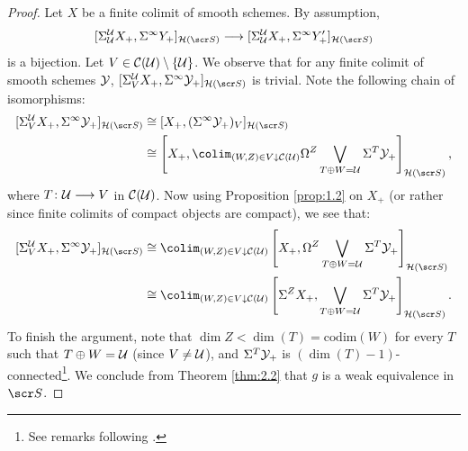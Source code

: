 \documentclass{amsart}
\theoremstyle{definition}
\begin{document}
\begin{proof}
Let $X$ be a finite colimit of smooth schemes. By assumption, \[[\SI^{\oU}_{\oU}X_+, \SI^{\infty}Y_+]_{\oH(\sS)} \rtarr [\SI^{\oU}_{\oU}X_+, \SI^{\infty}Y'_+]_{\oH(\sS)}\] \noindent is a bijection. Let $V \in {\mathcal{C}}({\mathcal{U}}) \setminus \{{\mathcal{U}}\}$. 
We observe that for any finite colimit of smooth schemes ${\mathcal{Y}}$, $[\SI^{\oU}_V X_+, \SI^{\infty}\oY_+]_{\oH(\sS)}$ is trivial. Note the following chain of isomorphisms:
\begin{equation*}
    \begin{split}
        [\SI^{\oU}_V X_+, \SI^{\infty}\oY_+]_{\oH(\sS)} &\cong [X_+, (\SI^{\infty}\oY_+)_V]_{\oH(\sS)}\\
        &\cong \left[X_+, \colim_{(W,Z) \in V \downarrow \oC(\oU)}\OM^Z\bigvee_{T \oplus W = \oU}\SI^{T}\oY_+\right]_{\oH(\sS)},
    \end{split}
\end{equation*}
where $T \colon {\mathcal{U}} \longrightarrow V$ in ${\mathcal{C}}({\mathcal{U}})$. Now using Proposition \ref{prop:1.2} on $X_+$ (or rather since finite colimits of compact objects are compact), we see that:
\begin{equation*}
    \begin{split}
        [\SI^{\oU}_V X_+, \SI^{\infty}\oY_+]_{\oH(\sS)} &\cong \colim_{(W,Z) \in V \downarrow \oC(\oU)} \left[X_+, \OM^Z \bigvee_{T \oplus W = \oU}\SI^{T}\oY_+\right]_{\oH(\sS)}\\
        &\cong \colim_{(W,Z) \in V \downarrow \oC(\oU)} \left[\SI^{Z} X_+, \bigvee_{T \oplus W = \oU}\SI^{T}\oY_+\right]_{\oH(\sS)}.
    \end{split}
\end{equation*}
\noindent To finish the argument, note that $\dim Z < \dim (T)=\mathrm{codim}(W)$ for every $T$ such that $T \oplus W = {\mathcal{U}}$ (since $V \neq {\mathcal{U}}$), and $\Sigma^{T} {\mathcal{Y}}_+$ is $(\dim(T)-1)$-connected\footnote{See remarks following \cite[Theorem 18]{morel12A1AT}.}. 
We conclude from Theorem \ref{thm:2.2} that $g$ is a weak equivalence in $\sS$.
\end{proof}
\end{document}

